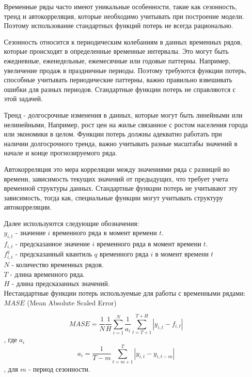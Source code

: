 Временные ряды часто имеют уникальные особенности, такие как сезонность, тренд и автокорреляция, которые необходимо учитывать при построение модели. Поэтому использование стандартных функций потерь не всегда рационально.

Сезонность относится к периодическим колебаниям в данных временных рядов, которые происходят в определенные временные интервалы. Это могут быть ежедневные, еженедельные, ежемесячные или годовые паттерны. Например, увеличение продаж в праздничные периоды.
Поэтому требуются функции потерь, способные учитывать периодические паттерны, важно правильно взвешивать ошибки для разных периодов. Стандартные функции потерь не справляются с этой задачей.

Тренд - долгосрочные изменения в данных, которые могут быть линейными или нелинейными,
Например, рост цен на жилье связанное с ростом населения города или экономики в целом.
Функции потерь должны адекватно работать при наличии долгосрочного тренда, важно учитывать разные масштабы значений в начале и конце прогнозируемого ряда.

Автокорреляция это мера корреляции между значениями ряда с разницей во времени, зависимость текущих значений от предыдущих, что требует учета временной структуры данных.
Стандартные функции потерь не учитывают эту зависимость, тогда как, специальные функции могут учитывать структуру автокорреляции.

Далее используются следующие обозначения:\\
$y_{i,t}$ - значение $i$ временного ряда в момент времени $t$.\\
$f_{i,t}$ - предсказанное значение $i$ временного ряда в момент времени $t$.\\
$f_{i,t}^q$ - предсказанный квантиль $q$ временного ряда $i$ в момент времени $t$\\
$N$ - количество временных рядов.\\
$T$ -  длина временного ряда.\\
$H$ - длина предсказанных значений.\\

Нестандартные функции потерь используемые для работы с временными рядами:\\

$MASE$ (Mean Absolute Scaled Error)

$$MASE = \frac{1}{N} \frac{1}{H} \sum_{i = 1}^{N} \frac{1}{a_{i}}\sum_{t = T + 1} ^ {T + H}|y_{i,t} - f_{i,t}| $$ , где $a_{i}$
$$a_{i} = \frac{1}{T - m} \sum_{t = m + 1}^{T}|y_{i,t} - y_{i, t - m}|$$, для $m$ - период сезонности.

